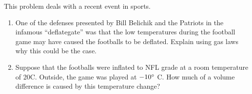 \begin{problem}
This problem deals with a recent event in sports.

\begin{enumerate}[label=(\alph*)]
    \item One of the defenses presented by Bill Belichik and the Patriots in the infamous ``deflategate'' was that the low temperatures during the football game may have caused the footballs to be deflated. Explain using gas laws why this could be the case.
    \item Suppose that the footballs were inflated to NFL grade at a room temperature of 20\degree C. Outside, the game was played at $-10\degree$ C. How much of a volume difference is caused by this temperature change?
\end{enumerate} 
\end{problem}